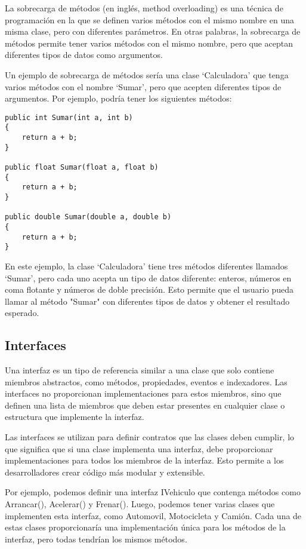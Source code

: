 \documentclass[executivepaper]{article}
\begin{document}
La sobrecarga de métodos (en inglés, method overloading) es una técnica de programación en la que se definen varios métodos con el mismo nombre en una misma clase, pero con diferentes parámetros. En otras palabras, la sobrecarga de métodos permite tener varios métodos con el mismo nombre, pero que aceptan diferentes tipos de datos como argumentos.

Un ejemplo de sobrecarga de métodos sería una clase \enquote*{Calculadora} que tenga varios métodos con el nombre \enquote*{Sumar}, pero que acepten diferentes tipos de argumentos. Por ejemplo, podría tener los siguientes métodos:

\begin{lstlisting}
public int Sumar(int a, int b)
{
    return a + b;
}

public float Sumar(float a, float b)
{
    return a + b;
}

public double Sumar(double a, double b)
{
    return a + b;
}
\end{lstlisting}

En este ejemplo, la clase \enquote*{Calculadora} tiene tres métodos diferentes llamados \enquote*{Sumar}, pero cada uno acepta un tipo de datos diferente: enteros, números en coma flotante y números de doble precisión. Esto permite que el usuario pueda llamar al método "Sumar" con diferentes tipos de datos y obtener el resultado esperado.

\subsection{Interfaces}

Una interfaz es un tipo de referencia similar a una clase que solo contiene miembros abstractos, como métodos, propiedades, eventos e indexadores. Las interfaces no proporcionan implementaciones para estos miembros, sino que definen una lista de miembros que deben estar presentes en cualquier clase o estructura que implemente la interfaz.

Las interfaces se utilizan para definir contratos que las clases deben cumplir, lo que significa que si una clase implementa una interfaz, debe proporcionar implementaciones para todos los miembros de la interfaz. Esto permite a los desarrolladores crear código más modular y extensible.

Por ejemplo, podemos definir una interfaz IVehiculo que contenga métodos como Arrancar(), Acelerar() y Frenar(). Luego, podemos tener varias clases que implementen esta interfaz, como Automovil, Motocicleta y Camión. Cada una de estas clases proporcionaría una implementación única para los métodos de la interfaz, pero todas tendrían los mismos métodos.
\end{document}
